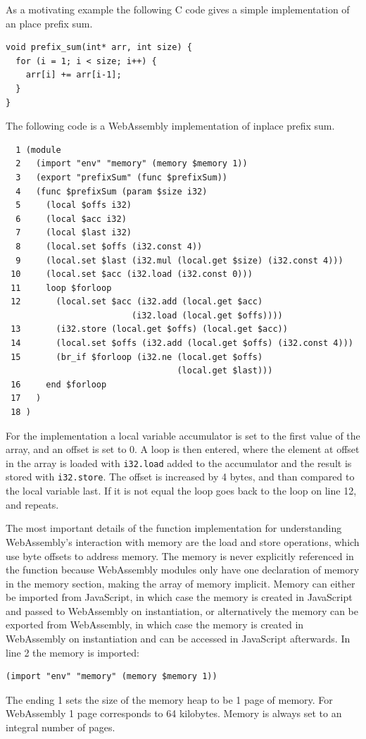 \documentclass[11pt]{book}
\begin{document}
As a motivating example the following C code gives a simple implementation of an place prefix sum.

\begin{verbatim}
void prefix_sum(int* arr, int size) {
  for (i = 1; i < size; i++) {
    arr[i] += arr[i-1];
  }
}
\end{verbatim}
The following code is a WebAssembly implementation of inplace prefix sum.
\begin{verbatim}
  1 (module
  2   (import "env" "memory" (memory $memory 1))
  3   (export "prefixSum" (func $prefixSum))
  4   (func $prefixSum (param $size i32)
  5     (local $offs i32)
  6     (local $acc i32)
  7     (local $last i32)
  8     (local.set $offs (i32.const 4))
  9     (local.set $last (i32.mul (local.get $size) (i32.const 4)))
 10     (local.set $acc (i32.load (i32.const 0)))
 11     loop $forloop
 12       (local.set $acc (i32.add (local.get $acc) 
                         (i32.load (local.get $offs))))
 13       (i32.store (local.get $offs) (local.get $acc))
 14       (local.set $offs (i32.add (local.get $offs) (i32.const 4)))
 15       (br_if $forloop (i32.ne (local.get $offs) 
                                  (local.get $last)))
 16     end $forloop
 17   )
 18 )
\end{verbatim}

For the implementation a local variable accumulator is set to the first value of the array, and an offset is set to 0. A loop is then entered, where the element at offset in the array is loaded with \texttt{i32.load} added to the accumulator and the result is stored with \texttt{i32.store}. The offset is increased by 4 bytes, and than compared to the local variable last. If it is not equal the loop goes back to the loop on line 12, and repeats.

The most important details of the function implementation for understanding WebAssembly's interaction with memory are the load and store operations, which use byte offsets to address memory. The memory is never explicitly referenced in the function because WebAssembly modules only have one declaration of memory in the memory section, making the array of memory implicit. Memory can either be imported from JavaScript, in which case the memory is created in JavaScript and passed to WebAssembly on instantiation, or alternatively the memory can be exported from WebAssembly, in which case the memory is created in WebAssembly on instantiation and can be accessed in JavaScript afterwards. In line 2 the memory is imported:
\begin{verbatim}
(import "env" "memory" (memory $memory 1))
\end{verbatim}
The ending 1 sets the size of the memory heap to be 1 page of memory. For WebAssembly 1 page corresponds to 64 kilobytes. Memory is always set to an integral number of pages.
\end{document}
